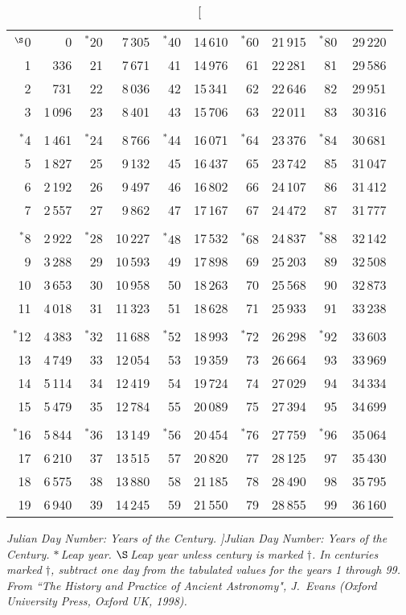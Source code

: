 \vspace*{1cm}

\begin{table}[h]\centering
\begin{tabular}{rr|rr|rr|rr|rr}
$^\S$0 & 0 & $^\ast$20 & 7\,305 & $^\ast$40 & 14\,610 & $^\ast$60 &
21\,915 & $^\ast$80 & 29\,220\\
1 & 336 & 21 & 7\,671 & 41 & 14\,976 & 61 &22\,281 & 81& \,29\,586\\
2 & 731 & 22 & 8\,036 & 42 & 15\,341 & 62 & 22\,646 & 82 & 29\,951\\
3 & 1\,096 & 23 & 8\,401 & 43 & 15\,706 & 63 & 22\,011& 83 & 30\,316\\
&&&&&&&\\
$^\ast$4& 1\,461& $^\ast$24& 8\,766& $^\ast$44 & 16\,071 & $^\ast$64
& 23\,376& $^\ast$84 & 30\,681\\
5 & 1\,827 & 25 & 9\,132& 45 & 16\,437& 65& 23\,742& 85& 31\,047\\
6& 2\,192& 26& 9\,497& 46& 16\,802& 66& 24\,107& 86& 31\,412\\
7& 2\,557&27&9\,862 & 47 & 17\,167& 67& 24\,472& 87& 31\,777\\
&&&&&&&\\
$^\ast$8 & 2\,922& $^\ast$28 & 10\,227 & $^\ast 48$ & 17\,532 & $^\ast 68$ & 24\,837& $^\ast$88& 32\,142\\
9 & 3\,288& 29 & 10\,593& 49& 17\,898& 69& 25\,203& 89& 32\,508\\
10& 3\,653& 30 & 10\,958& 50& 18\,263& 70& 25\,568& 90& 32\,873\\
11& 4\,018& 31& 11\,323& 51& 18\,628& 71& 25\,933& 91& 33\,238\\
&&&&&&&\\
$^\ast$12& 4\,383& $^\ast$32 & 11\,688 & $^\ast$52 & 18\,993 &
$^\ast$72 & 26\,298 & $^\ast$92 & 33\,603\\
13 & 4\,749 & 33 & 12\,054& 53& 19\,359 & 73& 26\,664 & 93& 33\,969\\
14 & 5\,114 & 34 & 12\,419 & 54 & 19\,724 & 74& 27\,029 & 94&34\,334\\
15& 5\,479 & 35& 12\,784& 55 & 20\,089 & 75& 27\,394 & 95 & 34\,699\\
&&&&&&&\\
$^\ast$16 & 5\,844& $^\ast$36& 13\,149& $^\ast$56 & 20\,454& $^\ast$76
&27\,759 & $^\ast$96& 35\,064\\
17& 6\,210& 37& 13\,515& 57& 20\,820& 77& 28\,125& 97& 35\,430\\
18& 6\,575& 38& 13\,880& 58& 21\,185& 78& 28\,490& 98& 35\,795\\
19& 6\,940& 39& 14\,245& 59& 21\,550& 79& 28\,855& 99&36\,160\\
\end{tabular}
\caption[\em Julian Day Number: Years of the Century. ]{\em Julian Day Number: Years of the Century. $\ast$\,Leap year. $\S$\,Leap year unless century is marked $\dag$. In centuries marked $\dag$, subtract one day from the tabulated values for the years 1 through 99.
From ``The History
and Practice of Ancient Astronomy", J.~Evans (Oxford University Press, Oxford UK, 1998).}\label{kt2}
\end{table}

